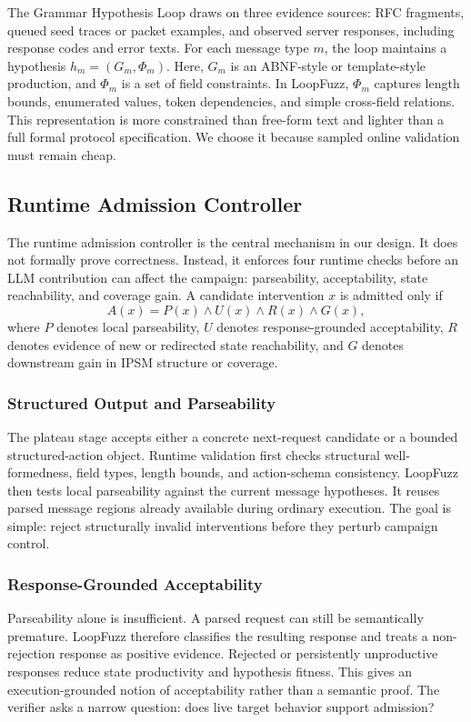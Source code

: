 \documentclass[conference]{IEEEtran}
\begin{document}
The Grammar Hypothesis Loop draws on three evidence sources: RFC fragments, queued seed traces or packet examples, and observed server responses, including response codes and error texts. For each message type $m$, the loop maintains a hypothesis $h_m=(G_m,\Phi_m)$. Here, $G_m$ is an ABNF-style or template-style production, and $\Phi_m$ is a set of field constraints. In LoopFuzz, $\Phi_m$ captures length bounds, enumerated values, token dependencies, and simple cross-field relations. This representation is more constrained than free-form text and lighter than a full formal protocol specification. We choose it because sampled online validation must remain cheap.

\subsection{Runtime Admission Controller}
The runtime admission controller is the central mechanism in our design. It does not formally prove correctness. Instead, it enforces four runtime checks before an LLM contribution can affect the campaign: parseability, acceptability, state reachability, and coverage gain. A candidate intervention $x$ is admitted only if
\[
A(x)=P(x) \land U(x) \land R(x) \land G(x),
\]
where $P$ denotes local parseability, $U$ denotes response-grounded acceptability, $R$ denotes evidence of new or redirected state reachability, and $G$ denotes downstream gain in IPSM structure or coverage.

\subsubsection{Structured Output and Parseability}
The plateau stage accepts either a concrete next-request candidate or a bounded structured-action object. Runtime validation first checks structural well-formedness, field types, length bounds, and action-schema consistency. LoopFuzz then tests local parseability against the current message hypotheses. It reuses parsed message regions already available during ordinary execution. The goal is simple: reject structurally invalid interventions before they perturb campaign control.

\subsubsection{Response-Grounded Acceptability}
Parseability alone is insufficient. A parsed request can still be semantically premature. LoopFuzz therefore classifies the resulting response and treats a non-rejection response as positive evidence. Rejected or persistently unproductive responses reduce state productivity and hypothesis fitness. This gives an execution-grounded notion of acceptability rather than a semantic proof. The verifier asks a narrow question: does live target behavior support admission?
\end{document}
